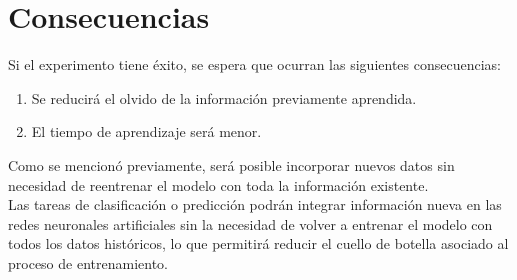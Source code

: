 \section{Consecuencias}

Si el experimento tiene éxito, se espera que ocurran las siguientes consecuencias:
\begin{enumerate}
    \item Se reducirá el olvido de la información previamente aprendida.
    \item El tiempo de aprendizaje será menor.
\end{enumerate}

Como se mencionó previamente, será posible incorporar nuevos datos sin necesidad de reentrenar el modelo con toda la información existente. \\

Las tareas de clasificación o predicción podrán integrar información nueva en las redes neuronales artificiales sin la necesidad de volver a entrenar el modelo con todos los datos históricos, lo que permitirá reducir el cuello de botella asociado al proceso de entrenamiento.
